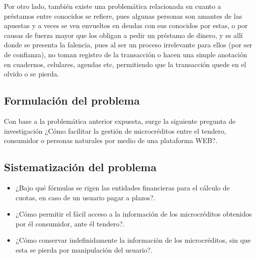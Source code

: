 {	Por otro lado, también existe una problemática relacionada en cuanto a préstamos entre conocidos se refiere, pues algunas personas son amantes de las apuestas y a veces se ven envueltos en deudas con sus conocidos por estas, o por causas de fuerza mayor que los obligan a pedir un préstamo de dinero, y es allí donde se presenta la falencia, pues al ser un proceso irrelevante para ellos (por ser de confianza), no toman registro de la transacción o hacen una simple anotación en cuadernos, celulares, agendas etc, permitiendo que la transacción quede en el olvido o se pierda.}

	\subsection{Formulación del problema}
	
	{Con base a la problemática anterior expuesta, surge la siguiente pregunta de investigación ¿Cómo facilitar la gestión de microcréditos entre el tendero, consumidor o personas naturales por medio de una plataforma WEB?.}
	
	\subsection{Sistematización del problema}
	
	\begin{itemize}
		\item ¿Bajo qué fórmulas se rigen las entidades financieras para el cálculo de cuotas, en caso de un usuario pagar a plazos?.
		\item ¿Cómo permitir el fácil acceso a la información de los microcréditos obtenidos por él consumidor, ante él tendero?.
		\item ¿Cómo conservar indefinidamente la información de los microcréditos, sin que esta se pierda por manipulación del usuario?.
	\end{itemize}
